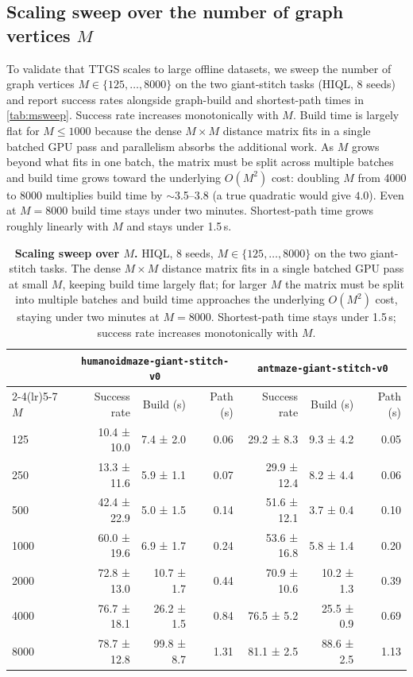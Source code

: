 \documentclass{article} %
\begin{document}
\subsection{Scaling sweep over the number of graph vertices $M$} \label{apdx:msweep}

To validate that TTGS scales to large offline datasets, we sweep the number of graph vertices $M\in\{125,\ldots,8000\}$ on the two giant-stitch tasks (HIQL, 8 seeds) and report success rates alongside graph-build and shortest-path times in \autoref{tab:msweep}. Success rate increases monotonically with $M$. Build time is largely flat for $M\le 1000$ because the dense $M\times M$ distance matrix fits in a single batched GPU pass and parallelism absorbs the additional work. As $M$ grows beyond what fits in one batch, the matrix must be split across multiple batches and build time grows toward the underlying $O(M^2)$ cost: doubling $M$ from 4000 to 8000 multiplies build time by $\sim$3.5--3.8 (a true quadratic would give $4.0$). Even at $M{=}8000$ build time stays under two minutes. Shortest-path time grows roughly linearly with $M$ and stays under 1.5\,s.

\begin{table}[H]
    \centering
    \small
    \caption{\textbf{Scaling sweep over $M$.} HIQL, 8 seeds, $M\in\{125,\ldots,8000\}$ on the two giant-stitch tasks. The dense $M\times M$ distance matrix fits in a single batched GPU pass at small $M$, keeping build time largely flat; for larger $M$ the matrix must be split into multiple batches and build time approaches the underlying $O(M^2)$ cost, staying under two minutes at $M{=}8000$. Shortest-path time stays under 1.5\,s; success rate increases monotonically with $M$.}
    \label{tab:msweep}
    \begin{tabular*}{\linewidth}{@{\extracolsep{\fill}}lrrr|rrr}
        \toprule
        & \multicolumn{3}{c}{\texttt{humanoidmaze-giant-stitch-v0}} & \multicolumn{3}{c}{\texttt{antmaze-giant-stitch-v0}} \\
        \cmidrule(lr){2-4}\cmidrule(lr){5-7}
        $M$ & Success rate & Build (s) & Path (s) & Success rate & Build (s) & Path (s) \\
        \midrule
        125  & 10.4 ± 10.0 & 7.4 ± 2.0  & 0.06 & 29.2 ± 8.3  & 9.3 ± 4.2  & 0.05 \\
        250  & 13.3 ± 11.6 & 5.9 ± 1.1  & 0.07 & 29.9 ± 12.4 & 8.2 ± 4.4  & 0.06 \\
        500  & 42.4 ± 22.9 & 5.0 ± 1.5  & 0.14 & 51.6 ± 12.1 & 3.7 ± 0.4  & 0.10 \\
        1000 & 60.0 ± 19.6 & 6.9 ± 1.7  & 0.24 & 53.6 ± 16.8 & 5.8 ± 1.4  & 0.20 \\
        2000 & 72.8 ± 13.0 & 10.7 ± 1.7 & 0.44 & 70.9 ± 10.6 & 10.2 ± 1.3 & 0.39 \\
        4000 & 76.7 ± 18.1 & 26.2 ± 1.5 & 0.84 & 76.5 ± 5.2  & 25.5 ± 0.9 & 0.69 \\
        8000 & 78.7 ± 12.8 & 99.8 ± 8.7 & 1.31 & 81.1 ± 2.5  & 88.6 ± 2.5 & 1.13 \\
        \bottomrule
    \end{tabular*}
\end{table}
\end{document}
